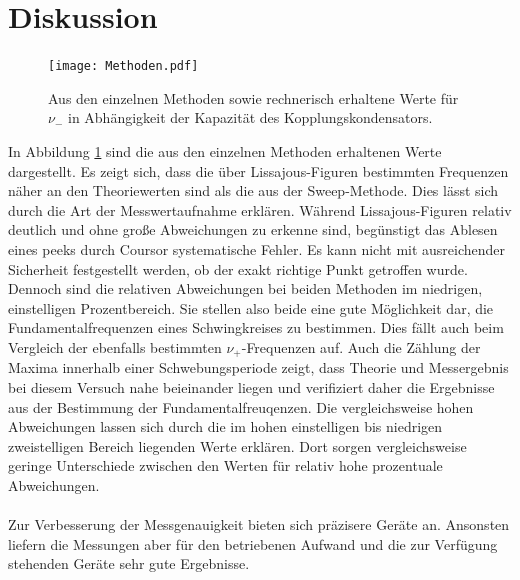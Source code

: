 \section{Diskussion}
\begin{figure}
  \centering
  \texttt{[image: Methoden.pdf]}
  \caption{Aus den einzelnen Methoden sowie rechnerisch erhaltene Werte für $\nu_-$ in
  Abhängigkeit der Kapazität des Kopplungskondensators.}
  \label{abb:1}
\end{figure}
In Abbildung \ref{abb:1} sind die aus den einzelnen Methoden erhaltenen Werte dargestellt.
Es zeigt sich, dass die über Lissajous-Figuren bestimmten Frequenzen näher an den Theoriewerten
sind als die aus der Sweep-Methode. Dies lässt sich durch die Art der Messwertaufnahme erklären.
Während Lissajous-Figuren relativ deutlich und ohne große Abweichungen zu erkenne sind,
begünstigt das Ablesen eines peeks durch Coursor systematische Fehler. Es kann nicht
mit ausreichender Sicherheit festgestellt werden, ob der exakt richtige Punkt getroffen wurde.
Dennoch sind die relativen Abweichungen bei beiden Methoden im niedrigen, einstelligen Prozentbereich.
Sie stellen also beide eine gute Möglichkeit dar, die Fundamentalfrequenzen eines Schwingkreises
zu bestimmen. Dies fällt auch beim Vergleich der ebenfalls bestimmten $\nu_+$-Frequenzen auf.
Auch die Zählung der Maxima innerhalb einer Schwebungsperiode zeigt, dass
Theorie und Messergebnis bei diesem Versuch nahe beieinander liegen und verifiziert daher die
Ergebnisse aus der Bestimmung der Fundamentalfreuqenzen. Die vergleichsweise hohen Abweichungen
lassen sich durch die im hohen einstelligen bis niedrigen zweistelligen Bereich liegenden Werte
erklären. Dort sorgen vergleichsweise geringe Unterschiede zwischen den Werten
für relativ hohe prozentuale Abweichungen.\\
\\
Zur Verbesserung der Messgenauigkeit bieten sich präzisere Geräte an. Ansonsten liefern die
Messungen aber für den betriebenen Aufwand und die zur Verfügung stehenden Geräte sehr gute
Ergebnisse.
\newpage
\nocite{*}
\printbibliography
